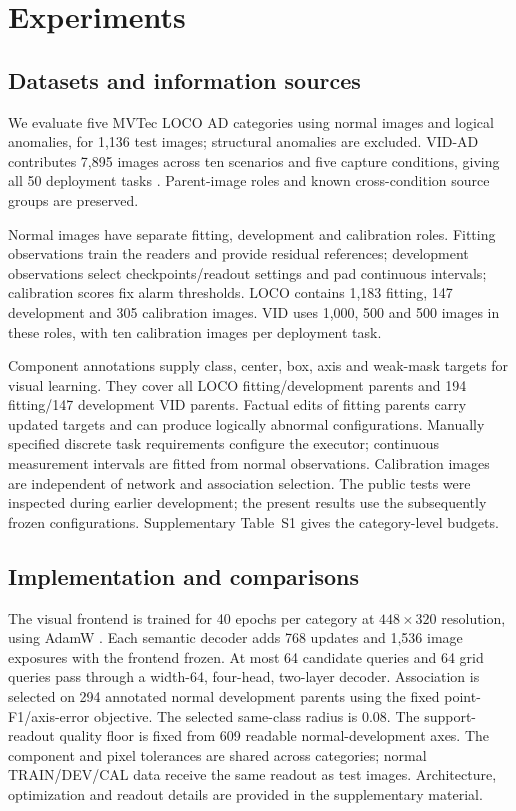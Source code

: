 \section{Experiments}
\subsection{Datasets and information sources}

We evaluate five MVTec LOCO AD categories using normal images and logical anomalies, for 1,136 test images; structural anomalies are excluded. VID-AD contributes 7,895 images across ten scenarios and five capture conditions, giving all 50 deployment tasks \cite{loco,vid}. Parent-image roles and known cross-condition source groups are preserved.

Normal images have separate fitting, development and calibration roles. Fitting observations train the readers and provide residual references; development observations select checkpoints/readout settings and pad continuous intervals; calibration scores fix alarm thresholds. LOCO contains 1,183 fitting, 147 development and 305 calibration images. VID uses 1,000, 500 and 500 images in these roles, with ten calibration images per deployment task.

Component annotations supply class, center, box, axis and weak-mask targets for visual learning. They cover all LOCO fitting/development parents and 194 fitting/147 development VID parents. Factual edits of fitting parents carry updated targets and can produce logically abnormal configurations. Manually specified discrete task requirements configure the executor; continuous measurement intervals are fitted from normal observations. Calibration images are independent of network and association selection. The public tests were inspected during earlier development; the present results use the subsequently frozen configurations. Supplementary Table~S1 gives the category-level budgets.

\subsection{Implementation and comparisons}\label{sec:comparisons}
The visual frontend is trained for 40 epochs per category at $448\times320$ resolution, using AdamW \cite{adamw}. Each semantic decoder adds 768 updates and 1,536 image exposures with the frontend frozen. At most 64 candidate queries and 64 grid queries pass through a width-64, four-head, two-layer decoder. Association is selected on 294 annotated normal development parents using the fixed point-F1/axis-error objective. The selected same-class radius is 0.08. The support-readout quality floor is fixed from 609 readable normal-development axes. The component and pixel tolerances are shared across categories; normal TRAIN/DEV/CAL data receive the same readout as test images. Architecture, optimization and readout details are provided in the supplementary material.

